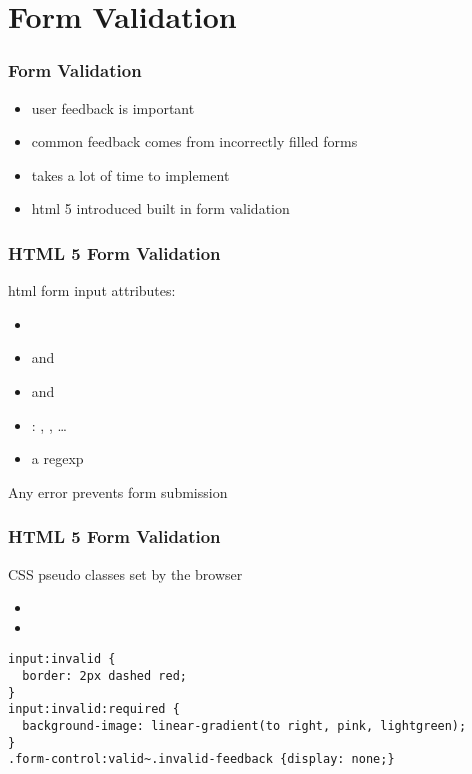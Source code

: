 \section{Form Validation}
\begin{frame}[fragile] \frametitle{Form Validation}
\begin{itemize}
  \item user feedback is important
  \item common feedback comes from incorrectly filled forms
  \item takes a lot of time to implement
  \item html 5 introduced built in form validation
\end{itemize}
\end{frame}

\begin{frame}[fragile] \frametitle{HTML 5 Form Validation}
html form input attributes:
\begin{itemize}
  \item {}
  \item {} and 
  \item {} and 
  \item {}: , , \ldots
  \item {} a regexp
\end{itemize}
\vspace{3mm}
Any error prevents form submission
\end{frame}

\begin{frame}[fragile] \frametitle{HTML 5 Form Validation}
CSS pseudo classes set by the browser
\begin{itemize}
  \item {}
  \item {}
\end{itemize}
\vspace{3mm}
\begin{lstlisting}[style=htmlcssjs]
input:invalid {
  border: 2px dashed red;
}
input:invalid:required {
  background-image: linear-gradient(to right, pink, lightgreen);
}
.form-control:valid~.invalid-feedback {display: none;}
\end{lstlisting}
\end{frame}

